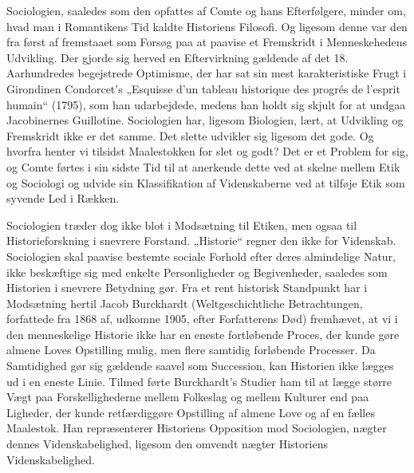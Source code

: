\documentclass[12pt,a4paper,openany]{book}
\newcommand{\opage}[1]{\marginnote{\footnotesize\textit{[#1]}}}
\begin{document}
Sociologien, saaledes som den opfattes af Comte og hans Efterfølgere,
minder om, hvad man i Romantikens Tid kaldte Historiens
Filosofi. Og ligesom denne var den fra først af fremstaaet som Forsøg
paa at paavise et Fremskridt i Menneskehedens Udvikling. Der
gjorde sig herved en Eftervirkning gældende af det 18. Aarhundredes
begejstrede Optimisme, der har sat sin mest karakteristiske Frugt i
Girondinen Condorcet’s „Esquisse d’un tableau historique des progrés
de l’esprit humain“ (1795), som han udarbejdede, medens han
holdt sig skjult for at undgaa Jacobinernes Guillotine. Sociologien
har, ligesom Biologien, lært, at Udvikling og Fremskridt ikke er det
samme. Det slette udvikler sig ligesom det gode. Og hvorfra henter
vi tilsidst Maalestokken for slet og godt? Det er et Problem for sig,
og Comte førtes i sin sidste Tid til at anerkende dette ved at skelne
mellem Etik og Sociologi og udvide sin Klassifikation af Videnskaberne
ved at tilføje Etik som syvende Led i Rækken.

Sociologien træder dog ikke blot i Modsætning til Etiken, men
ogsaa til Historieforskning i snevrere Forstand. „Historie“ regner
den ikke for Videnskab. Sociologien skal paavise bestemte sociale
Forhold efter deres almindelige Natur, ikke beskæftige sig med enkelte
Personligheder og Begivenheder, saaledes som Historien i snevrere
Betydning gør. Fra et rent historisk Standpunkt har i Modsætning
hertil Jacob Burckhardt (Weltgeschichtliche Betrachtungen,
forfattede fra 1868 af, udkomne 1905, efter Forfatterens Død)
fremhævet, at vi i den menneskelige Historie ikke har en eneste fortløbende
Proces, der kunde gøre almene Loves Opstilling mulig, men
flere samtidig forløbende Processer. Da Samtidighed gør sig gældende
saavel som Succession, kan Historien ikke lægges ud i en
\opage{58}eneste Linie. Tilmed førte Burckhardt’s Studier ham til at lægge
større Vægt paa Forskellighederne mellem Folkeslag og mellem Kulturer
end paa Ligheder, der kunde retfærdiggøre Opstilling af almene
Love og af en fælles Maalestok. Han repræsenterer Historiens
Opposition mod Sociologien, nægter dennes Videnskabelighed, ligesom
den omvendt nægter Historiens Videnskabelighed.
\end{document}
